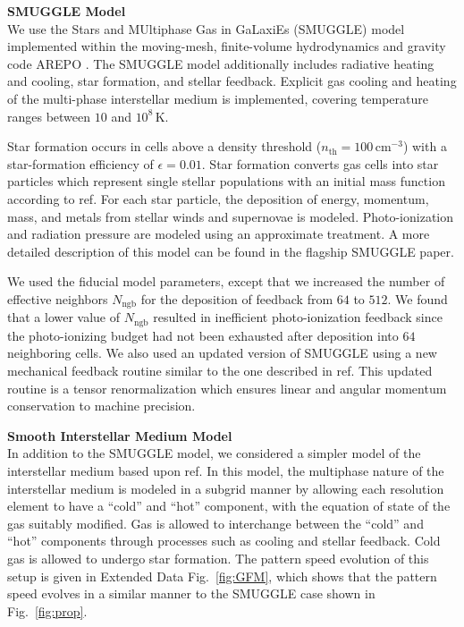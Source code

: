 \documentclass{natureprintstyle}
\begin{document}
\noindent
{\bf SMUGGLE Model}
\\
\noindent
We use the Stars and MUltiphase Gas in GaLaxiEs (SMUGGLE) model
\cite{2019MNRAS.489.4233M} implemented within the moving-mesh, finite-volume
hydrodynamics and gravity code AREPO \cite{2010MNRAS.401..791S}. The SMUGGLE model
additionally includes radiative heating and cooling, star
formation, and stellar feedback. Explicit gas cooling and heating of the
multi-phase interstellar medium is implemented, covering temperature ranges
between $10$ and $10^8\,\textrm{K}$.

Star formation occurs in cells above a density threshold
($n_{\textrm{th}}=100\,\textrm{cm}^{-3}$) with a star-formation efficiency of
$\epsilon = 0.01$. Star formation converts gas cells into star particles which
represent single stellar populations with an initial mass function according to ref.\cite{2001ApJ...554.1274C} For each star particle, the deposition
of energy, momentum, mass, and metals from stellar winds and supernovae is modeled.
Photo-ionization and radiation pressure are modeled using an approximate
treatment. A more detailed description of this model can be found in the
flagship SMUGGLE paper.\cite{2019MNRAS.489.4233M}

We used the fiducial model parameters, except that we increased the number of
effective neighbors $N_{\textrm{ngb}}$ for the deposition of feedback from
$64$ to $512$. We found that a lower value of $N_{\textrm{ngb}}$ resulted in
inefficient photo-ionization feedback since the photo-ionizing budget had not
been exhausted after deposition into $64$ neighboring cells. We also used an
updated version of SMUGGLE using a new mechanical feedback routine similar to
the one described in ref.\cite{2018MNRAS.480..800H} This updated routine is a
tensor renormalization which ensures linear and angular momentum conservation
to machine precision.

\vspace{12pt}

\noindent
{\bf Smooth Interstellar Medium Model}
\\
\noindent
In addition to the SMUGGLE model, we considered a simpler model of the
interstellar medium based upon ref.\cite{2003MNRAS.339..289S} In this model,
the multiphase nature of the interstellar medium is modeled in a subgrid
manner by allowing each resolution element to have a ``cold'' and ``hot''
component, with the equation of state of the gas suitably modified. Gas is
allowed to interchange between the ``cold'' and ``hot'' components through
processes such as cooling and stellar feedback. Cold gas is allowed to undergo
star formation. The pattern speed evolution of this setup is given in Extended
Data Fig.~\ref{fig:GFM}, which shows that the pattern speed evolves in a
similar manner to the SMUGGLE case shown in Fig.~\ref{fig:prop}.
\end{document}
